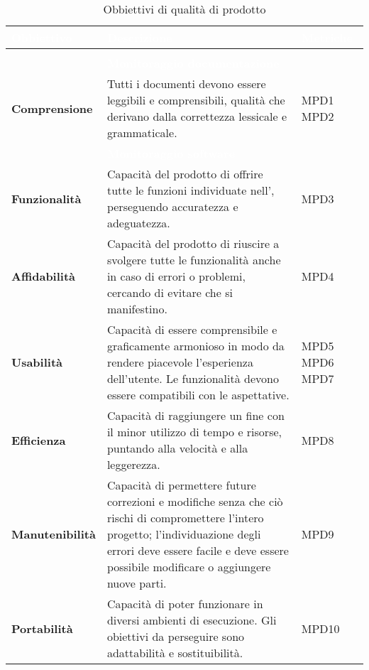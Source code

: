 {
\setlength\arrayrulewidth{0.95pt}
\renewcommand{\arraystretch}{1.5}
\begin{longtable}{C{3cm} | C{9.5cm} | C{2.5cm}}

\textcolor{white}{\textbf{Obbiettivo}}&
\textcolor{white}{\textbf{Descrizione}}&
\textcolor{white}{\textbf{Metriche}} \\
\endfirsthead
{}\\
\endfoot
{}\caption{Obbiettivi di qualità di prodotto}
\endlastfoot
	
 & \textcolor{white}{\textbf{Monitoraggio documentazione}} &  \\

	\textbf{Comprensione} &
	 Tutti i documenti devono essere leggibili e comprensibili, qualità che derivano dalla correttezza lessicale e grammaticale. &
	MPD1 \newline MPD2 \\
 
 & \textcolor{white}{\textbf{Monitoraggio software}} &  \\
 
	\textbf{Funzionalità} & 
	Capacità del prodotto di offrire tutte le funzioni individuate nell'\AdRv{}, perseguendo accuratezza e adeguatezza. &
	MPD3 \\
	
	\textbf{Affidabilità} &
	 Capacità del prodotto di riuscire a svolgere tutte le funzionalità anche in caso di errori o problemi, cercando di evitare che si manifestino. &
	MPD4 \\
	
	\textbf{Usabilità} &
	Capacità di essere comprensibile e graficamente armonioso in modo da rendere piacevole l'esperienza dell'utente. Le funzionalità devono essere compatibili con le aspettative. &
    MPD5 \newline MPD6 \newline MPD7 \\
    
	\textbf{Efficienza} & 
	Capacità di raggiungere un fine con il minor utilizzo di tempo e risorse, puntando alla velocità e alla leggerezza. &
	MPD8 \\
	
	\textbf{Manutenibilità} & 
	Capacità di permettere future correzioni e modifiche senza che ciò rischi di compromettere l'intero progetto; l'individuazione degli errori deve essere facile e deve essere possibile modificare o aggiungere nuove parti. &
 	MPD9 \\
 	
	\textbf{Portabilità} & 
	Capacità di poter funzionare in diversi ambienti di esecuzione. Gli obiettivi da perseguire sono adattabilità e sostituibilità. &
	MPD10 \\
	
\end{longtable}	

}

